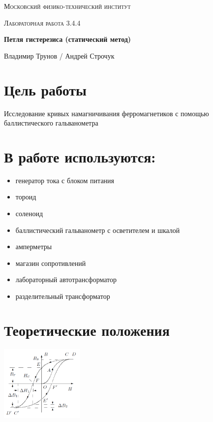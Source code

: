 \documentclass[a4paper]{article}
\begin{document}
	\centering
	\vspace{5cm}
	{\scshape\LARGE Московский физико-технический институт \par}
	\vspace{1cm}
	{\scshape\Large Лабораторная работа 3.4.4\par}
	\vspace{1cm}
	{\huge\bfseries Петля гистерезиса (статический метод) \par}
	\vspace{1cm}
	{\LARGE Владимир Трунов / Андрей Строчук}
	


\section{Цель работы}
Исследование кривых намагничивания ферромагнетиков с помощью баллистического гальванометра

\section{В работе используются:}
\begin{itemize}
    \item генератор тока с блоком питания
    \item тороид
    \item соленоид
    \item баллистический гальванометр с осветителем и шкалой
    \item амперметры
    \item магазин сопротивлений
    \item лабораторный автотрансформатор
    \item разделительный трансформатор
\end{itemize}

\section{Теоретические положения}

\begin{floatingfigure}{41mm}
\noindent
\hfil
\includegraphics[width=41mm]{fig1.PNG}
\hfil
\caption{Петля гистерезиса ферромагнетика}
\label{figCurvesFF}
\end{floatingfigure}
\end{document}
